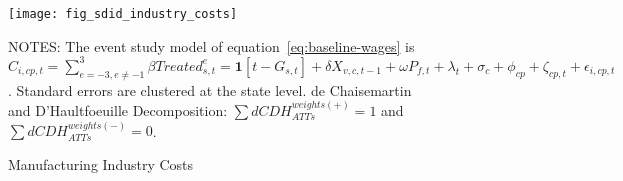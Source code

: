\begin{figure}[H]
    \centering
    \texttt{[image: fig\_sdid\_industry\_costs]}
    \caption{Manufacturing Industry Costs}
    \label{fig:baseline-manufacturing-industry-costs}
    \begin{minipage}{14cm}
        \vspace{0.05in}
        NOTES: The event study model of equation~\ref{eq:baseline-wages} is $C_{i,cp,t} = \sum_{{e = -3},{e \neq -1}}^{3} \beta Treated_{s,t}^e = \textbf{1}[t - G_{s,t}] + \delta X_{v,c,t-1} + \omega P_{f,t} + \lambda_{t} + \sigma_{c} + \phi_{cp} + \zeta_{cp,t} + \epsilon_{i,cp,t}$. Standard errors are clustered at the state level. de Chaisemartin and D'Haultfoeuille Decomposition: $\sum dCDH_{ATTs}^{weights(+)} = 1$ and $\sum dCDH_{ATTs}^{weights(-)} = 0$.
    \end{minipage}
\end{figure}